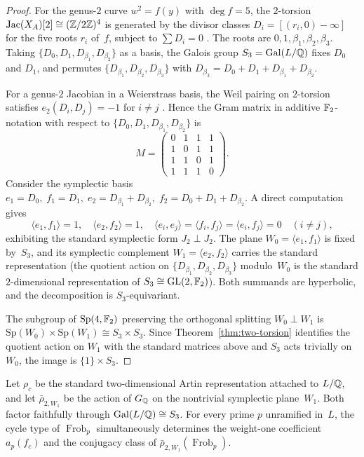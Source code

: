 \begin{proof}
For the genus-\(2\) curve \(w^2=f(y)\) with \(\deg f=5\), the \(2\)-torsion \(\operatorname{Jac}(X_A)[2]\cong (\mathbb{Z}/2\mathbb{Z})^4\) is generated by the divisor classes \(D_i=[(r_i,0)-\infty]\) for the five roots \(r_i\) of~\(f\), subject to \(\sum D_i=0\) \cite{CasselsFlynn1996}. The roots are \(0,1,\beta_1,\beta_2,\beta_3\). Taking \(\{D_0,D_1,D_{\beta_1},D_{\beta_2}\}\) as a basis, the Galois group \(S_3=\operatorname{Gal}(L/\mathbb{Q})\) fixes \(D_0\) and \(D_1\), and permutes \(\{D_{\beta_1},D_{\beta_2},D_{\beta_3}\}\) with \(D_{\beta_3}=D_0+D_1+D_{\beta_1}+D_{\beta_2}\).

For a genus-\(2\) Jacobian in a Weierstrass basis, the Weil pairing on \(2\)-torsion satisfies \(e_2(D_i,D_j)=-1\) for \(i\neq j\) \cite{CasselsFlynn1996}. Hence the Gram matrix in additive \(\mathbb{F}_2\)-notation with respect to \(\{D_0,D_1,D_{\beta_1},D_{\beta_2}\}\) is
\[
M=\begin{pmatrix}0&1&1&1\\1&0&1&1\\1&1&0&1\\1&1&1&0\end{pmatrix}.
\]
Consider the symplectic basis \(e_1=D_0,\;f_1=D_1,\;e_2=D_{\beta_1}+D_{\beta_2},\;f_2=D_0+D_1+D_{\beta_2}\). A direct computation gives
\[
\langle e_1,f_1\rangle=1,\quad \langle e_2,f_2\rangle=1,\quad \langle e_i,e_j\rangle=\langle f_i,f_j\rangle=\langle e_i,f_j\rangle=0\quad (i\neq j),
\]
exhibiting the standard symplectic form \(J_2\perp J_2\). The plane \(W_0=\langle e_1,f_1\rangle\) is fixed by~\(S_3\), and its symplectic complement \(W_1=\langle e_2,f_2\rangle\) carries the standard representation (the quotient action on \(\{D_{\beta_1},D_{\beta_2},D_{\beta_3}\}\) modulo~\(W_0\) is the standard \(2\)-dimensional representation of \(S_3\cong \mathrm{GL}(2,\mathbb{F}_2)\)). Both summands are hyperbolic, and the decomposition is \(S_3\)-equivariant.

The subgroup of \(\mathrm{Sp}(4,\mathbb{F}_2)\) preserving the orthogonal splitting \(W_0\perp W_1\) is \(\mathrm{Sp}(W_0)\times\mathrm{Sp}(W_1)\cong S_3\times S_3\). Since Theorem~\ref{thm:two-torsion} identifies the quotient action on \(W_1\) with the standard matrices above and \(S_3\) acts trivially on \(W_0\), the image is \(\{1\}\times S_3\).
\end{proof}

\begin{corollary}\label{cor:weight-one-mod2}
Let \(\rho_c\) be the standard two-dimensional Artin representation attached to \(L/\mathbb{Q}\), and let \(\bar\rho_{2,W_1}\) be the action of \(G_{\mathbb{Q}}\) on the nontrivial symplectic plane~\(W_1\). Both factor faithfully through \(\operatorname{Gal}(L/\mathbb{Q})\cong S_3\). For every prime \(p\) unramified in~\(L\), the cycle type of \(\operatorname{Frob}_p\) simultaneously determines the weight-one coefficient \(a_p(f_c)\) and the conjugacy class of \(\bar\rho_{2,W_1}(\operatorname{Frob}_p)\).
\end{corollary}

